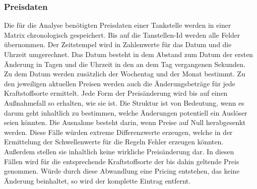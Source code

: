 \documentclass[12pt,a4paper,bibliography=totocnumbered,listof=totocnumbered]{scrartcl}
\begin{document}
\subsubsection{Preisdaten}
Die für die Analyse benötigten Preisdaten einer Tankstelle werden in einer Matrix chronologisch gespeichert. Bis auf die Tanstellen-Id werden alle Felder übernommen. Der Zeitstempel wird in Zahlenwerte für das Datum und die Uhrzeit umgerechnet. Das Datum besteht in dem Abstand zum Datum der ersten Änderung in Tagen und die Uhrzeit in den an dem Tag vergangenen Sekunden. Zu dem Datum werden zusätzlich der Wochentag und der Monat bestimmt. Zu den jeweiligen aktuellen Preisen werden auch die Änderungsbeträge für jede Kraftstoffsorte ermittelt. Jede Form der Preisänderung wird bis auf einen Außnahmefall so erhalten, wie sie ist. Die Struktur ist von Bedeutung, wenn es darum geht inhaltlich zu bestimmen, welche Änderungen potentiell ein Auslöser seien könnten. Die Ausnahme besteht darin, wenn Preise auf Null herabgesenkt werden. Diese Fälle würden extreme Differenzwerte erzeugen, welche in der Ermittelung der Schwellenwerte für die Regeln Fehler erzeugen könnten. Außerdem stellen sie inhaltlich keine wirkliche Preisänderung dar. In diesen Fällen wird für die entsprechende Kraftstoffsorte der bis dahin geltende Preis genommen. Würde durch diese Abwandlung eine Pricing entstehen, das keine Änderung beinhaltet, so wird der komplette Eintrag entfernt.

\end{document}
